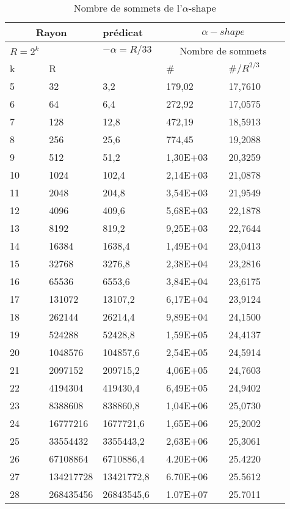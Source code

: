 \begin{table}[H]
  \begin{tabular}{|p{0.09\linewidth}|p{0.13\linewidth}||p{0.23\linewidth}||p{0.23\linewidth}|p{0.23\linewidth}|}
    \hline
    \multicolumn{2}{|c||}{Rayon} & prédicat               & \multicolumn{2}{|c|}{$\alpha-shape$} \\  \hline 
    $R=2^k$  &                   & $-\alpha = R/33$ & \multicolumn{2}{|c|}{Nombre de sommets} \\ \hline
    k        & R                 &                        & \# & $\# / R^{2/3}$ \\ 
    \hline
    5  & 32        & 3,2        & 179,02   & 17,7610\\
    6  & 64        & 6,4        & 272,92   & 17,0575\\
    7  & 128       & 12,8       & 472,19   & 18,5913\\
    8  & 256       & 25,6       & 774,45   & 19,2088\\
    9  & 512       & 51,2       & 1,30E+03 & 20,3259\\
    10 & 1024      & 102,4      & 2,14E+03 & 21,0878\\
    11 & 2048      & 204,8      & 3,54E+03 & 21,9549\\
    12 & 4096      & 409,6      & 5,68E+03 & 22,1878\\
    13 & 8192      & 819,2      & 9,25E+03 & 22,7644\\
    14 & 16384     & 1638,4     & 1,49E+04 & 23,0413\\
    15 & 32768     & 3276,8     & 2,38E+04 & 23,2816\\
    16 & 65536     & 6553,6     & 3,84E+04 & 23,6175\\
    17 & 131072    & 13107,2    & 6,17E+04 & 23,9124\\
    18 & 262144    & 26214,4    & 9,89E+04 & 24,1500\\
    19 & 524288    & 52428,8    & 1,59E+05 & 24,4137\\
    20 & 1048576   & 104857,6   & 2,54E+05 & 24,5914\\
    21 & 2097152   & 209715,2   & 4,06E+05 & 24,7603\\
    22 & 4194304   & 419430,4   & 6,49E+05 & 24,9402\\
    23 & 8388608   & 838860,8   & 1,04E+06 & 25,0730\\
    24 & 16777216  & 1677721,6  & 1,65E+06 & 25,2002\\
    25 & 33554432  & 3355443,2  & 2,63E+06 & 25,3061\\
    26 & 67108864  & 6710886,4  & 4.20E+06 & 25.4220\\
    27 & 134217728 & 13421772,8 & 6.70E+06 & 25.5612\\
    28 & 268435456 & 26843545,6 & 1.07E+07 & 25.7011\\

    \hline
  \end{tabular} 
  \caption{Nombre de sommets de l'$\alpha$-shape}
\end{table}


